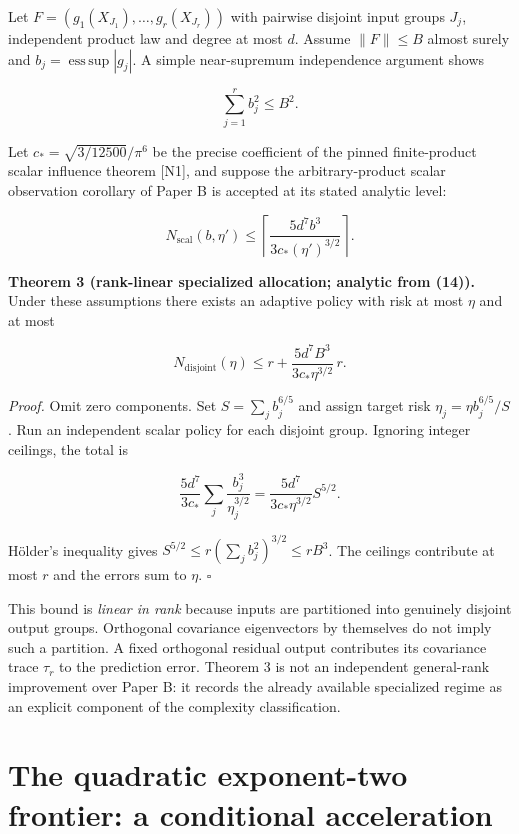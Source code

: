 \documentclass[
  10pt,
]{article}
\begin{document}
Let \(F=(g_1(X_{J_1}),\ldots,g_r(X_{J_r}))\) with pairwise disjoint
input groups \(J_j\), independent product law and degree at most \(d\).
Assume \(\|F\|\le B\) almost surely and
\(b_j=\operatorname{ess\,sup}|g_j|\). A simple near-supremum
independence argument shows

\[
\sum_{j=1}^r b_j^2\le B^2. \tag{13}
\]

Let \(c_*=\sqrt{3/12500}/\pi^6\) be the precise coefficient of the
pinned finite-product scalar influence theorem {[}N1{]}, and suppose the
arbitrary-product scalar observation corollary of Paper B is accepted at
its stated analytic level:

\[
N_{\mathrm{scal}}(b,\eta')\le
\left\lceil \frac{5d^7b^3}{3c_*(\eta')^{3/2}}\right\rceil. \tag{14}
\]

\textbf{Theorem 3 (rank-linear specialized allocation; analytic from
(14)).} Under these assumptions there exists an adaptive policy with
risk at most \(\eta\) and at most

\[
\boxed{N_{\mathrm{disjoint}}(\eta)\le
r+\frac{5d^7B^3}{3c_*\eta^{3/2}}\,r.} \tag{15}
\]

\emph{Proof.} Omit zero components. Set \(S=\sum_j b_j^{6/5}\) and
assign target risk \(\eta_j=\eta b_j^{6/5}/S\). Run an independent
scalar policy for each disjoint group. Ignoring integer ceilings, the
total is

\[
\frac{5d^7}{3c_*}\sum_j\frac{b_j^3}{\eta_j^{3/2}}
=\frac{5d^7}{3c_*\eta^{3/2}}S^{5/2}.
\]

Hölder's inequality gives \(S^{5/2}\le r(\sum_jb_j^2)^{3/2}\le rB^3\).
The ceilings contribute at most \(r\) and the errors sum to \(\eta\).
\(\square\)

This bound is \emph{linear in rank} because inputs are partitioned into
genuinely disjoint output groups. Orthogonal covariance eigenvectors by
themselves do not imply such a partition. A fixed orthogonal residual
output contributes its covariance trace \(\tau_r\) to the prediction
error. Theorem 3 is not an independent general-rank improvement over
Paper B: it records the already available specialized regime as an
explicit component of the complexity classification.

\section{The quadratic exponent-two frontier: a conditional
acceleration}\label{the-quadratic-exponent-two-frontier-a-conditional-acceleration}
\end{document}
